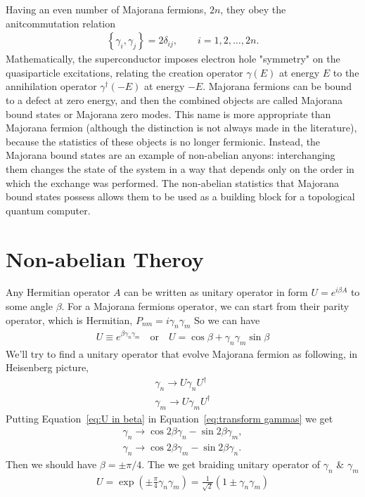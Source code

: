 \documentclass{article}
\begin{document}
Having an even number of Majorana fermions, $ 2n $, they obey the anitcommutation relation
\begin{align}
	\left\{\gamma_i, \gamma_j\right\}=2 \delta_{i j}, \qquad i=1, 2, \dots, 2n  .
\end{align}
Mathematically, the superconductor imposes electron hole "symmetry" on the quasiparticle excitations, relating the creation operator $\gamma(E)$ at energy $E$ to the annihilation operator $\gamma^{\dagger}(-E)$ at energy $-E$. Majorana fermions can be bound to a defect at zero energy, and then the combined objects are called Majorana bound states or Majorana zero modes. This name is more appropriate than Majorana fermion (although the distinction is not always made in the literature), because the statistics of these objects is no longer fermionic. Instead, the Majorana bound states are an example of non-abelian anyons: interchanging them changes the state of the system in a way that depends only on the order in which the exchange was performed. The non-abelian statistics that Majorana bound states possess allows them to be used as a building block for a topological quantum computer.

\section{Non-abelian Theroy} %
\label{sec:Non-abelian Theroy}
Any Hermitian operator $ A $ can be written as unitary operator in form $ U = e^{i\beta A} $ to some angle $ \beta $.
For a Majorana fermions operator, we can start from their parity operator, which is Hermitian, $ P_{nm} = i \gamma_n \gamma_m $
So we can have
\begin{align}
	U \equiv e^{\beta \gamma_n \gamma_m} \quad \text{or} \quad U = \cos{\beta} + \gamma_n \gamma_m \sin{\beta}
	\label{eq:U in beta}
\end{align}
We'll try to find a unitary operator that evolve Majorana fermion as following, in Heisenberg picture,
\begin{align}
	\gamma_n \rightarrow U \gamma_n U ^\dagger \\
	\gamma_m \rightarrow U \gamma_m U ^\dagger
	\label{eq:transform gammas}
\end{align}
Putting Equation~\ref{eq:U in beta} in Equation~\ref{eq:transform gammas} we get
\begin{align}
	\gamma_n \rightarrow \cos{2 \beta} \gamma_n - \sin{2 \beta} \gamma_m, \\
	\gamma_n \rightarrow \cos{2 \beta} \gamma_m - \sin{2 \beta} \gamma_n.
	\label{eq:subst in transformation}
\end{align}
Then we should have $ \beta = \pm \pi / 4 $. The we get braiding unitary operator of $ \gamma_n $ \& $ \gamma_m $
\begin{align}
	U = \exp \left( \pm \frac{\pi}{4} \gamma_n \gamma_m\right)
	=\frac{1}{\sqrt{2}}\left(1 \pm \gamma_n \gamma_m\right)
\end{align}
\end{document}
